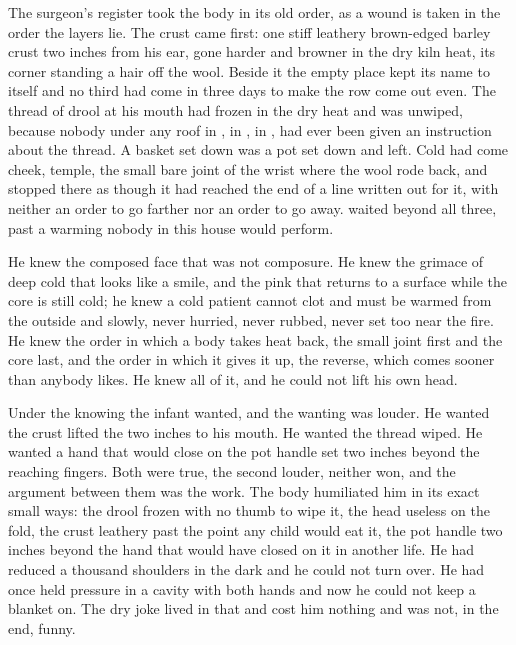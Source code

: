 The surgeon's register took the body in its old order, as a wound is taken in the order the layers lie. The crust came first: one stiff leathery brown-edged barley crust two inches from his ear, gone harder and browner in the dry kiln heat, its corner standing a hair off the wool. Beside it the empty place kept its name to itself and no third had come in three days to make the row come out even. The thread of drool at his mouth had frozen in the dry heat and was unwiped, because nobody under any roof in , in , in , had ever been given an instruction about the thread. A basket set down was a pot set down and left. Cold had come cheek, temple, the small bare joint of the wrist where the wool rode back, and stopped there as though it had reached the end of a line written out for it, with neither an order to go farther nor an order to go away.  waited beyond all three, past a warming nobody in this house would perform.

He knew the composed face that was not composure. He knew the grimace of deep cold that looks like a smile, and the pink that returns to a surface while the core is still cold; he knew a cold patient cannot clot and must be warmed from the outside and slowly, never hurried, never rubbed, never set too near the fire. He knew the order in which a body takes heat back, the small joint first and the core last, and the order in which it gives it up, the reverse, which comes sooner than anybody likes. He knew all of it, and he could not lift his own head.

Under the knowing the infant wanted, and the wanting was louder. He wanted the crust lifted the two inches to his mouth. He wanted the thread wiped. He wanted a hand that would close on the pot handle set two inches beyond the reaching fingers. Both were true, the second louder, neither won, and the argument between them was the work. The body humiliated him in its exact small ways: the drool frozen with no thumb to wipe it, the head useless on the fold, the crust leathery past the point any child would eat it, the pot handle two inches beyond the hand that would have closed on it in another life. He had reduced a thousand shoulders in the dark and he could not turn over. He had once held pressure in a cavity with both hands and now he could not keep a blanket on. The dry joke lived in that and cost him nothing and was not, in the end, funny.

\scenebreak

